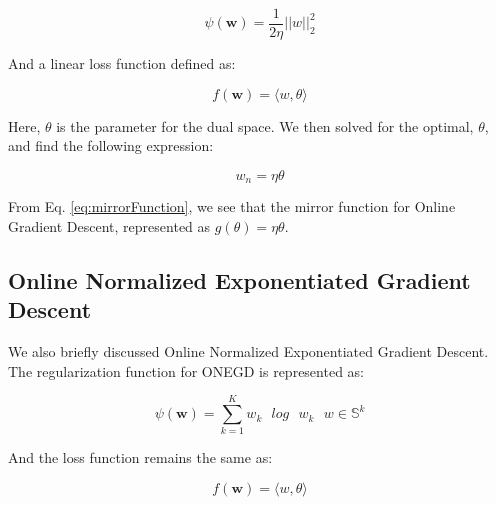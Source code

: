 \documentclass[11pt]{article}
\begin{document}
\begin{equation}
    \psi(\textbf{w}) =\dfrac{1}{2\eta}||w||_2^2
\end{equation}{}

And a linear loss function defined as:

\begin{equation}
    f(\textbf{w}) = \langle w, \theta \rangle
\end{equation}

Here, \textbf{$\theta$} is the parameter for the dual space. We then solved for the optimal, \textbf{$\theta$}, and find the following expression:

\begin{equation}
    w_n = \eta \theta
    \label{eq:mirrorFunction}
\end{equation}

From Eq. \ref{eq:mirrorFunction}, we see that the mirror function for Online Gradient Descent, represented as $g(\theta) = \eta \theta$.



\subsection{Online Normalized Exponentiated Gradient Descent}

We also briefly discussed Online Normalized Exponentiated Gradient Descent. The regularization function for ONEGD is represented as:

\begin{equation}
    \psi(\textbf{w}) = \sum_{k = 1}^{K} w_k \text{ } log \text{ } w_k \text{  } w \in \mathbb{S}^k
\end{equation}

And the loss function remains the same as:

\begin{equation}
    f(\textbf{w}) = \langle w, \theta \rangle
    \label{eq:exponentiatedtLoss}
\end{equation}
\end{document}
